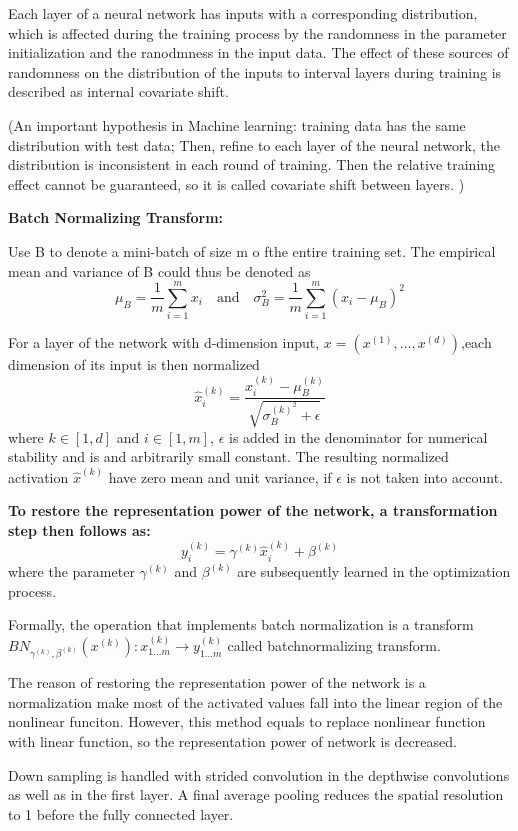 \documentclass[11pt,en,bibstyle=ieeetr]{elegantpaper}
\begin{document}
Each layer of a neural network has inputs with a corresponding distribution, which is 
affected during the training process by the randomness in the parameter initialization and the ranodmness in the input data.
The effect of these sources of randomness on the distribution of the inputs to interval layers during training is described as internal covariate shift.

(An important hypothesis in Machine learning: training data has the same distribution with test data; Then, refine to each layer of the neural network, the distribution is inconsistent in each round of training. Then the relative training effect cannot be guaranteed, so it is called covariate shift between layers. )


\textbf{Batch Normalizing Transform:}

Use B to denote a mini-batch of size m o fthe entire training set. The empirical mean and variance of B could thus be denoted as 
$$ 
\mu _B = \frac{1}{m}\sum_{i=1}^{m}x_i \quad \text{and}\quad \sigma ^2_B = \frac{1}{m}\sum_{i=1}^{m}(x_i-\mu _B)^2
$$

For a layer of the network with d-dimension input, $ x = (x^{(1)},\ldots, x^{(d)}) $,each dimension of its input is then normalized
$$ 
\hat{x}_i^{(k)} = \frac{x_i^{(k)}-\mu _{B}^{(k)}}{\sqrt{\sigma _{B}^{(k)^2}+\epsilon }}
$$
where $ k \in [1,d] $ and $ i \in [1,m] $, $ \epsilon  $ is added in the denominator for numerical stability and is and arbitrarily small constant.
The resulting normalized activation $ \hat{x}^{(k)} $ have zero mean and unit variance, if $ \epsilon $ is not taken into account.

\textbf{To restore the representation power of the network, a transformation step then follows as:}
$$ 
y_i^{(k)} = \gamma ^{(k)} \hat{x}_i^{(k)} + \beta^{(k)}
$$
where the parameter $ \gamma ^{(k)} $ and $ \beta ^{(k)} $ are subsequently learned in the optimization process.

Formally, the operation that implements batch normalization is a transform $ BN_{\gamma ^{(k)},\beta ^{(k)}}(x^{(k)}):x_{1\ldots m}^{(k)} \rightarrow y_{1 \ldots m}^{(k)} $ called batchnormalizing transform.

The reason of restoring the representation power of the network is a normalization make most of the activated values fall into the linear region of the nonlinear funciton. 
However, this method equals to replace nonlinear function with linear function, so the representation power of network is decreased.

Down sampling is handled with strided convolution in the depthwise convolutions as well as in the  first layer. A final average pooling reduces the spatial resolution to 1 before the fully connected layer.
\end{document}
